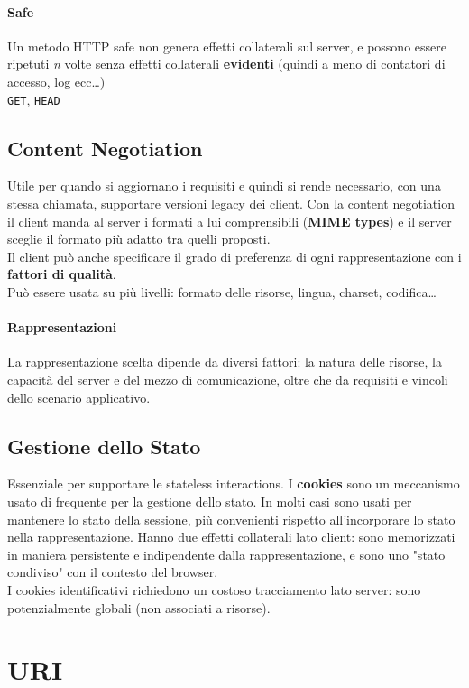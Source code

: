\documentclass[10pt]{article}
\begin{document}
\paragraph{Safe} Un metodo HTTP safe non genera effetti collaterali sul server, e possono essere ripetuti \textit{n} volte senza effetti collaterali \textbf{evidenti} (quindi a meno di contatori di accesso, log ecc\ldots)\\
\texttt{GET}, \texttt{HEAD}
\subsection{Content Negotiation}
Utile per quando si aggiornano i requisiti e quindi si rende necessario, con una stessa chiamata, supportare versioni legacy dei client. Con la content negotiation il client manda al server i formati a lui comprensibili (\textbf{MIME types}) e il server sceglie il formato più adatto tra quelli proposti.\\
Il client può anche specificare il grado di preferenza di ogni rappresentazione con i \textbf{fattori di qualità}.\\
Può essere usata su più livelli: formato delle risorse, lingua, charset, codifica\ldots
\paragraph{Rappresentazioni} La rappresentazione scelta dipende da diversi fattori: la natura delle risorse, la capacità del server e del mezzo di comunicazione, oltre che da requisiti e vincoli dello scenario applicativo.
\subsection{Gestione dello Stato}
Essenziale per supportare le stateless interactions. I \textbf{cookies} sono un meccanismo usato di frequente per la gestione dello stato. In molti casi sono usati per mantenere lo stato della sessione, più convenienti rispetto all'incorporare lo stato nella rappresentazione. Hanno due effetti collaterali lato client: sono memorizzati in maniera persistente e indipendente dalla rappresentazione, e sono uno "stato condiviso" con il contesto del browser.\\
I cookies identificativi richiedono un costoso tracciamento lato server: sono potenzialmente globali (non associati a risorse).
\section{URI}
\end{document}
